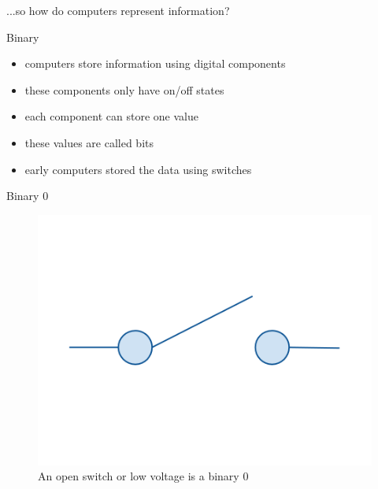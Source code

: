 \documentclass[xcolor={dvipsnames}]{beamer}
\begin{document}
\begin{frame}
	\begin{center}
	...so how do computers represent information?
	\end{center}
\end{frame}

\begin{frame}{Binary}
	\begin{itemize}
		\item computers store information using digital components
		\pause
		\item these components only have on/off states
		\pause
		\item each component can store one value
		\pause
		\item these values are called bits
		\pause
		\item early computers stored the data using switches
	\end{itemize}
\end{frame}

\begin{frame}{Binary 0}
	\begin{figure}
		\includegraphics[trim =3cm 6cm 3cm 6cm, clip=true, width=1\textwidth]{open}
		\caption{An open switch or low voltage is a binary 0}
	\end{figure}
\end{frame}
\end{document}
